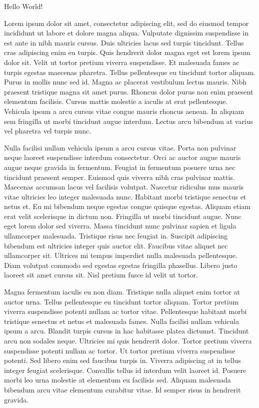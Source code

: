 \documentclass{article} %
\begin{document}
    Hello World!
    
    Lorem ipsum dolor sit amet, consectetur adipiscing elit, sed do eiusmod tempor incididunt ut labore et dolore magna aliqua. Vulputate dignissim suspendisse in est ante in nibh mauris cursus. Duis ultricies lacus sed turpis tincidunt. Tellus cras adipiscing enim eu turpis. Quis hendrerit dolor magna eget est lorem ipsum dolor sit. Velit ut tortor pretium viverra suspendisse. Et malesuada fames ac turpis egestas maecenas pharetra. Tellus pellentesque eu tincidunt tortor aliquam. Purus in mollis nunc sed id. Magna ac placerat vestibulum lectus mauris. Nibh praesent tristique magna sit amet purus. Rhoncus dolor purus non enim praesent elementum facilisis. Cursus mattis molestie a iaculis at erat pellentesque. Vehicula ipsum a arcu cursus vitae congue mauris rhoncus aenean. In aliquam sem fringilla ut morbi tincidunt augue interdum. Lectus arcu bibendum at varius vel pharetra vel turpis nunc.
    
    Nulla facilisi nullam vehicula ipsum a arcu cursus vitae. Porta non pulvinar neque laoreet suspendisse interdum consectetur. Orci ac auctor augue mauris augue neque gravida in fermentum. Feugiat in fermentum posuere urna nec tincidunt praesent semper. Euismod quis viverra nibh cras pulvinar mattis. Maecenas accumsan lacus vel facilisis volutpat. Nascetur ridiculus mus mauris vitae ultricies leo integer malesuada nunc. Habitant morbi tristique senectus et netus et. Eu mi bibendum neque egestas congue quisque egestas. Aliquam etiam erat velit scelerisque in dictum non. Fringilla ut morbi tincidunt augue. Nunc eget lorem dolor sed viverra. Massa tincidunt nunc pulvinar sapien et ligula ullamcorper malesuada. Tristique risus nec feugiat in. Suscipit adipiscing bibendum est ultricies integer quis auctor elit. Faucibus vitae aliquet nec ullamcorper sit. Ultrices mi tempus imperdiet nulla malesuada pellentesque. Diam volutpat commodo sed egestas egestas fringilla phasellus. Libero justo laoreet sit amet cursus sit. Nisl pretium fusce id velit ut tortor.
    
    Magna fermentum iaculis eu non diam. Tristique nulla aliquet enim tortor at auctor urna. Tellus pellentesque eu tincidunt tortor aliquam. Tortor pretium viverra suspendisse potenti nullam ac tortor vitae. Pellentesque habitant morbi tristique senectus et netus et malesuada fames. Nulla facilisi nullam vehicula ipsum a arcu. Blandit turpis cursus in hac habitasse platea dictumst. Tincidunt arcu non sodales neque. Ultricies mi quis hendrerit dolor. Tortor pretium viverra suspendisse potenti nullam ac tortor. Ut tortor pretium viverra suspendisse potenti. Sed libero enim sed faucibus turpis in. Viverra adipiscing at in tellus integer feugiat scelerisque. Convallis tellus id interdum velit laoreet id. Posuere morbi leo urna molestie at elementum eu facilisis sed. Aliquam malesuada bibendum arcu vitae elementum curabitur vitae. Id semper risus in hendrerit gravida.
    
\end{document}
